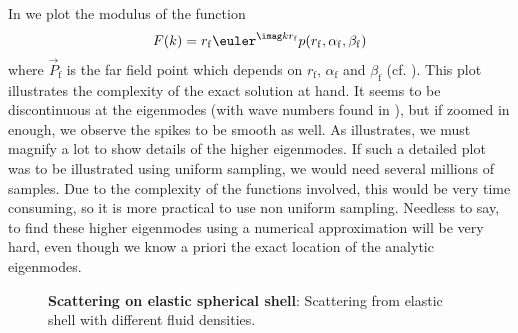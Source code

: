 In  we plot the modulus of the function
\begin{equation*}
	F(k) = r_{\mathrm{f}}\euler^{\imag k r_{\mathrm{f}}} p(r_{\mathrm{f}},\alpha_{\mathrm{f}},\beta_{\mathrm{f}})
\end{equation*}
where $\vec{P}_{\mathrm{f}}$ is the far field point which depends on $r_{\mathrm{f}}$, $\alpha_{\mathrm{f}}$ and $\beta_{\mathrm{f}}$ (cf. ). This plot illustrates the complexity of the exact solution at hand. It seems to be discontinuous at the eigenmodes (with wave numbers found in ), but if zoomed in enough, we observe the spikes to be smooth as well. As  illustrates, we must magnify a lot to show details of the higher eigenmodes. If such a detailed plot was to be illustrated using uniform sampling, we would need several millions of samples. Due to the complexity of the functions involved, this would be very time consuming, so it is more practical to use non uniform sampling. Needless to say, to find these higher eigenmodes using a numerical approximation will be very hard, even though we know a priori the exact location of the analytic eigenmodes. 
\begin{figure}
	\centering
	\ifplotData
	\fi
	\caption[Scattering from elastic shell with different fluid densities]{\textbf{Scattering on elastic spherical shell}: Scattering from elastic shell with different fluid densities.}
\label{Fig2:BackScatteredPressureDensities}
\end{figure}

